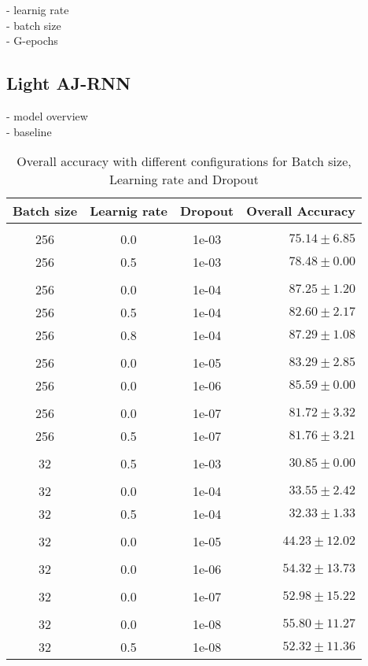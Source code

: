 - learnig rate\\
- batch size \\
- G-epochs

\pagebreak
\subsection{Light AJ-RNN}
- model overview\\
- baseline

\begin{table}[!htbp]
  \centering
  \begin{tabular}{cccr} 
      Batch size & Learnig rate & Dropout & Overall Accuracy\\[0.2cm] 
      \hline \\[-0.2cm]
      256 & 0.0 & 1e-03 & $75.14 \pm 6.85$\\
      256 & 0.5 & 1e-03 & $78.48 \pm 0.00$\\[0.05cm] \hline \\[-0.25cm]

      256 & 0.0 & 1e-04 & $87.25 \pm 1.20$\\
      256 & 0.5 & 1e-04 & $82.60 \pm 2.17$\\
      256 & 0.8 & 1e-04 & $87.29 \pm 1.08$\\[0.05cm] \hline \\[-0.25cm]

      256 & 0.0 & 1e-05 & $83.29 \pm 2.85$\\
      256 & 0.0 & 1e-06 & $85.59 \pm 0.00$\\[0.05cm] \hline \\[-0.25cm]

      256 & 0.0 & 1e-07 & $81.72 \pm 3.32$\\
      256 & 0.5 & 1e-07 & $81.76 \pm 3.21$\\[0.05cm] \hline \\[-0.25cm]

      32  & 0.5 & 1e-03 & $30.85 \pm 0.00$\\[0.05cm] \hline \\[-0.25cm]

      32  & 0.0 & 1e-04 & $33.55 \pm 2.42$\\
      32  & 0.5 & 1e-04 & $32.33 \pm 1.33$\\[0.05cm] \hline \\[-0.25cm]

      32  & 0.0 & 1e-05 & $44.23 \pm 12.02$\\[0.05cm] \hline \\[-0.25cm]
      32  & 0.0 & 1e-06 & $54.32 \pm 13.73$\\[0.05cm] \hline \\[-0.25cm]
      32  & 0.0 & 1e-07 & $52.98 \pm 15.22$\\[0.05cm] \hline \\[-0.25cm]
      32  & 0.0 & 1e-08 & $55.80 \pm 11.27$\\
      32  & 0.5 & 1e-08 & $52.32 \pm 11.36$\\
  \end{tabular}
  \caption{Overall accuracy with different configurations for Batch size, Learning rate and Dropout}
  \label{tab:AJRNNBatchSizeResults}
\end{table}
